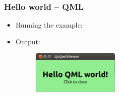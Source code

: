 \begin{frame}[fragile]
  \frametitle{Hello world -- QML}

  \begin{itemize}
  \item Running the example:
  \item Output:
    \begin{figure}[!t]
    \includegraphics[width=0.4\textwidth]{images/hello_qml.png}
    \end{figure}
  \end{itemize}
\end{frame}

